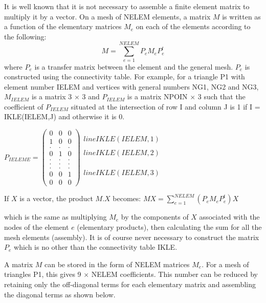 It is well known that it is not necessary to assemble a finite element matrix
to multiply it by a vector. On a mesh of NELEM elements, a matrix $M$ is written
as a function of the elementary matrices $M_{e}$ on each of the elements according
to the following:
\[M=\sum _{e=1}^{NELEM}P_{e} M_{e} P_{e}^{t}  \]
where $P_{e}$ is a transfer matrix between the element and the general mesh.
$P_{e}$ is constructed using the connectivity table. For example, for a
triangle P1 with element number IELEM and vertices with general numbers NG1,
NG2 and NG3, $M_{IELEM}$ is a matrix 3 $\times$ 3 and $P_{IELEM}$ is a matrix
NPOIN $\times$ 3 such that the coefficient of $P_{IELEM}$ situated at the
intersection of row I and column J is
1 if I = IKLE(IELEM,J) and otherwise it is 0.

$P_{IELEME}=\left(
  \begin{array}{ccc}
    0 & 0 & 0 \\
    1 & 0 & 0 \\
    . & . & . \\
    0 & 1 & 0 \\
    . & . & . \\
    . & . & . \\
    . & . & . \\
    0 & 0 & 1 \\
    0 & 0 & 0
  \end{array}
\right)
  \begin{array}{c}
    \\
    line IKLE(IELEM,1) \\
    \\
    line IKLE(IELEM,2) \\
    \\
    \\
    \\
    line IKLE(IELEM,3) \\
    \\
  \end{array}
$


If $X$ is a vector, the product $M.X$ becomes:
$MX=\sum _{e=1}^{NELEM}(P_e M_e P_{e}^{t} )X $

which is the same as multiplying $M_{e}$ by the components of $X$ associated with the
nodes of the element $e$ (elementary products), then calculating the sum for all
the mesh elements (assembly). It is of course never necessary to construct the
matrix $P_{e}$ which is no other than the connectivity table IKLE.

A matrix $M$ can be stored in the form of NELEM matrices $M_e$. For a mesh of
triangles P1, this gives 9 $\times$ NELEM coefficients. This number can be reduced by
retaining only the off-diagonal terms for each elementary matrix and assembling
the diagonal terms as shown below.

